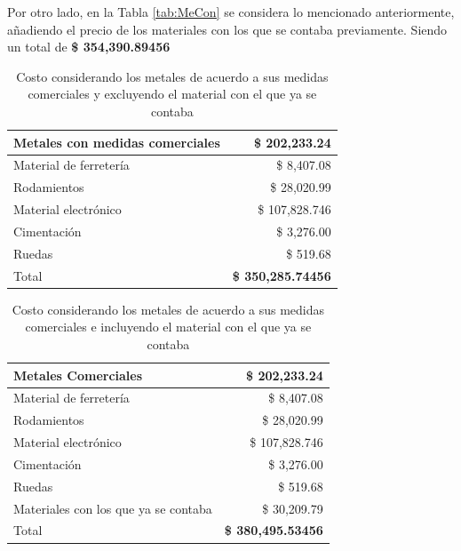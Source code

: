 Por otro lado, en la Tabla \ref{tab:MeCon} se considera lo mencionado anteriormente, añadiendo el precio de los materiales con los que se contaba previamente. Siendo un total de \textcolor[rgb]{ 1,  0,  0}{\textbf{ \$ 354,390.89456 }}
\newpage

\begin{table}[H]
  \centering
  \caption{Costo considerando los metales de acuerdo a sus medidas comerciales y excluyendo el material con el que ya se contaba}
    \begin{tabular}{|l|r|}
    \hline
    Metales con medidas comerciales &  \$  202,233.24  \\
    \hline
    Material de ferretería &  \$      8,407.08  \\
    \hline
    Rodamientos  &  \$    28,020.99  \\
    \hline
     Material electrónico  & \$    107,828.746 \\
    \hline
    Cimentación &  \$      3,276.00  \\
    \hline
    Ruedas &  \$          519.68  \\
    \hline
    Total & \textcolor[rgb]{ 1,  0,  0}{\textbf{ \$    350,285.74456 }} \\
    \hline
    \end{tabular}%
  \label{tab:CoSin}%
\end{table}%

\begin{table}[H]
  \centering
  \caption{Costo considerando los metales de acuerdo a sus medidas comerciales e incluyendo el material con el que ya se contaba}
    \begin{tabular}{|l|r|}
    \hline
    Metales Comerciales &  \$  202,233.24  \\
    \hline
    Material de ferretería &  \$      8,407.08  \\
    \hline
    Rodamientos  &  \$    28,020.99  \\
    \hline
     Material electrónico  &  \$  107,828.746  \\
    \hline
    Cimentación &  \$      3,276.00  \\
    \hline
    Ruedas &  \$          519.68  \\
    \hline
    Materiales con los que ya se contaba &  \$    30,209.79  \\
    \hline
    Total & \textcolor[rgb]{ 1,  0,  0}{\textbf{ \$  380,495.53456 }} \\
    \hline
    \end{tabular}%
  \label{tab:CoCon}%
\end{table}%


